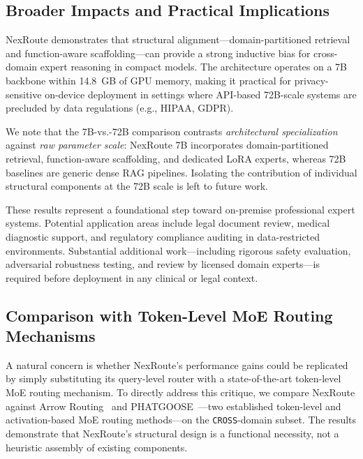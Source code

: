 \documentclass[a4paper,fleql]{cas-sc}
\begin{document}
\subsection{Broader Impacts and Practical Implications}
NexRoute demonstrates that structural alignment---domain-partitioned retrieval
and function-aware scaffolding---can provide a strong inductive bias for
cross-domain expert reasoning in compact models. The architecture operates on
a 7B backbone within 14.8~GB of GPU memory, making it practical for
privacy-sensitive on-device deployment in settings where API-based 72B-scale
systems are precluded by data regulations (e.g., HIPAA, GDPR).

We note that the 7B-vs.-72B comparison contrasts \emph{architectural specialization} against \emph{raw parameter scale}: NexRoute 7B incorporates domain-partitioned retrieval, function-aware scaffolding, and dedicated LoRA experts, whereas 72B baselines are generic dense RAG pipelines. Isolating the contribution of individual structural components at the 72B scale is left to future work.

These results represent a foundational step toward on-premise professional
expert systems. Potential application areas include legal document review,
medical diagnostic support, and regulatory compliance auditing in
data-restricted environments. Substantial additional work---including rigorous
safety evaluation, adversarial robustness testing, and review by licensed
domain experts---is required before deployment in any clinical or legal
context.

\subsection{Comparison with Token-Level MoE Routing Mechanisms}
\label{ssec:moe_routing}

A natural concern is whether NexRoute's performance gains could be replicated
by simply substituting its query-level router with a state-of-the-art
token-level MoE routing mechanism. To directly address this critique, we
compare NexRoute against Arrow Routing~\citep{arrow2024routing} and
PHATGOOSE~\citep{muqeeth2024phatgoose}---two established token-level and
activation-based MoE routing methods---on the \texttt{CROSS}-domain subset.
The results demonstrate that NexRoute's structural design is a functional
necessity, not a heuristic assembly of existing components.
\end{document}

